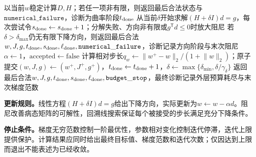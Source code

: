 \begin{AlgorithmContract}
\begin{algorithm}[H]
{  以当前$w$稳定计算$D,H$；若任一项非有限，则返回最后合法状态与$\mathtt{numerical\_failure}$，诊断为曲率阶段$t_{\rm done}$\;
  从当前$\delta$开始求解$(H+\delta I)d=g$，每次尝试令$s_{\rm done}\leftarrow s_{\rm done}+1$；分解失败、方向非有限或$g^{\mathsf T}d\le0$时放大阻尼\;
  若$\delta>\delta_{\max}$仍无有限下降方向，则返回最后合法$w,J,g,t_{\rm done},s_{\rm done},\ell_{\rm done},\mathtt{numerical\_failure}$，诊断记录方向阶段与末次阻尼\;
  $\alpha\leftarrow1$，$\mathrm{accepted}\leftarrow\mathrm{false}$\;
  计算相对步长$q_w\leftarrow\lVert w^+-w\rVert_2/(1+\lVert w\rVert_2)$；原子提交$(w,J,g)\leftarrow(w^+,J^+,g^+)$，$t_{\rm done}\leftarrow t_{\rm done}+1$，$\delta\leftarrow\max\{\delta_{\min},\delta/\gamma_\delta\}$\;
}
返回最后合法$w,J,g,t_{\rm done},s_{\rm done},\ell_{\rm done},\mathtt{budget\_stop}$，最终诊断记录外层预算耗尽与末次梯度范数\;
\end{algorithm}
\end{AlgorithmContract}

\label{struct:V2-C05-CH23}
\textbf{更新规则。}线性方程$(H+\delta I)d=g$给出下降方向，实际更新为$w\leftarrow w-\alpha d$。阻尼改善病态矩阵的可解性，回溯线搜索保证每个被接受的步长满足充分下降条件。

\label{struct:V2-C05-CH24}
\textbf{停止条件。}梯度无穷范数控制一阶最优性，参数相对变化控制迭代停滞，迭代上限提供保护。计算结果应同时给出最终目标值、梯度范数和迭代次数；仅因达到上限而退出不能表述为已经收敛。

